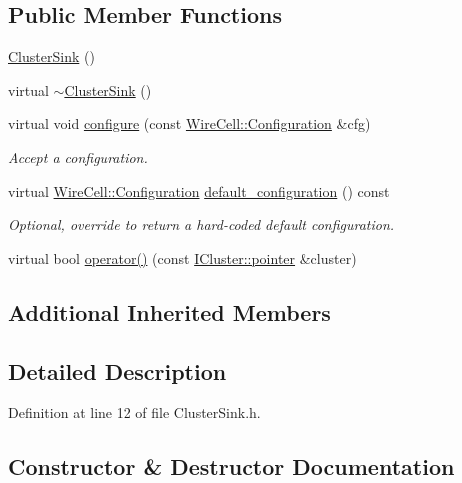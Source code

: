 \subsection*{Public Member Functions}
\begin{DoxyCompactItemize}
\item 
\hyperlink{class_wire_cell_1_1_img_1_1_cluster_sink_a9ad824e450e36ac91a3a3194b3e492b4}{Cluster\+Sink} ()
\item 
virtual \hyperlink{class_wire_cell_1_1_img_1_1_cluster_sink_a9d687ac785dc58a61e3fbe818e29aaa1}{$\sim$\+Cluster\+Sink} ()
\item 
virtual void \hyperlink{class_wire_cell_1_1_img_1_1_cluster_sink_ac53ceab525a2b8f87258e7309cc98bed}{configure} (const \hyperlink{namespace_wire_cell_a9f705541fc1d46c608b3d32c182333ee}{Wire\+Cell\+::\+Configuration} \&cfg)
\begin{DoxyCompactList}\small\item\em Accept a configuration. \end{DoxyCompactList}\item 
virtual \hyperlink{namespace_wire_cell_a9f705541fc1d46c608b3d32c182333ee}{Wire\+Cell\+::\+Configuration} \hyperlink{class_wire_cell_1_1_img_1_1_cluster_sink_a78a90dd617b3aad0933c1d0f8fc055a7}{default\+\_\+configuration} () const
\begin{DoxyCompactList}\small\item\em Optional, override to return a hard-\/coded default configuration. \end{DoxyCompactList}\item 
virtual bool \hyperlink{class_wire_cell_1_1_img_1_1_cluster_sink_aacf43e19e297947a4dd80e54ee8775f6}{operator()} (const \hyperlink{class_wire_cell_1_1_i_data_aff870b3ae8333cf9265941eef62498bc}{I\+Cluster\+::pointer} \&cluster)
\end{DoxyCompactItemize}
\subsection*{Additional Inherited Members}


\subsection{Detailed Description}


Definition at line 12 of file Cluster\+Sink.\+h.



\subsection{Constructor \& Destructor Documentation}
\mbox{\label{class_wire_cell_1_1_img_1_1_cluster_sink_a9ad824e450e36ac91a3a3194b3e492b4}} 
